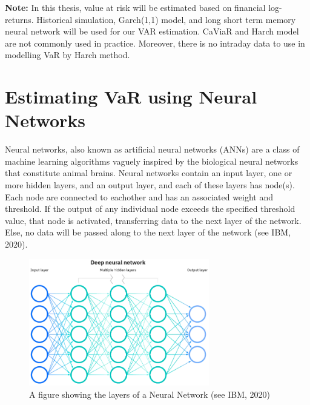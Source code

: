 \documentclass[a4paper,11pt,oneside]{book}
\begin{document}
\newline\newline
\textbf{Note:} In this thesis, value at risk will be estimated based on financial log-returns. Historical simulation, Garch(1,1) model, and long short term memory neural network will be used for our VAR estimation. CaViaR and Harch model are not commonly used in practice. Moreover, there is no intraday data to use in modelling VaR by Harch method.

\chapter{Estimating VaR using Neural Networks
}
Neural networks, also known as artificial neural networks (ANNs) are a class of machine learning algorithms vaguely inspired by the biological neural networks that constitute animal brains.\newline\newline
Neural networks contain an input layer, one or more hidden layers, and an output layer, and each of these layers has node(s). Each node are connected to eachother and has an associated weight and threshold. If the output of any individual node exceeds the specified threshold value, that node is activated, transferring data to the next layer of the network. Else, no data will be passed along to the next layer of the network (see IBM, 2020).
\begin{figure}[!h]
	\centering
	\includegraphics[width=0.7\textwidth]{figures/NN}
	\caption{A figure showing the layers of a Neural Network (see IBM, 2020)}
	\label{firstfig}
\end{figure}\newline
\end{document}
